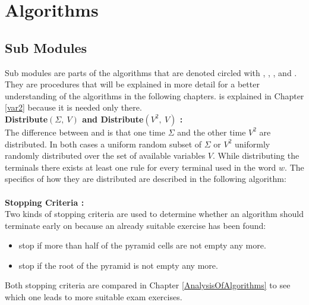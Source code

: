 
\section{Algorithms}\label{algorithms}
\subsection{Sub Modules} \label{subModules}
Sub modules are parts of the algorithms that are denoted circled with , , ,  and . They are procedures that will be explained in more detail for a better understanding of the algorithms in the following chapters.  is explained in Chapter \ref{var2} because it is needed only there.\\

\noindent \textbf{Distribute$(\Sigma,\ V) $  and Distribute$(V^2,\ V)$ :}\\
The difference between  and  is that one time $\Sigma$ and the other time $V^2$ are distributed. In both cases a uniform random subset of $\Sigma$ or $V^2$ uniformly randomly distributed over the set of available variables $V$. While distributing the terminals there exists at least one rule for every terminal used in the word $w$. The specifics of how they are distributed are described in the following algorithm: \\

\noindent
{} \\

\noindent \textbf{Stopping Criteria :}\\
Two kinds of stopping criteria are used to determine whether an algorithm should terminate early on because an already suitable exercise has been found:
\begin{itemize}[noitemsep,nolistsep]
	\item stop if more than half of the pyramid cells are not empty any more.
	\item stop if the root of the pyramid is not empty any more.
\end{itemize}
Both stopping criteria are compared in Chapter \ref{AnalysisOfAlgorithms} to see which one leads to more suitable exam exercises. \\
\pagebreak

